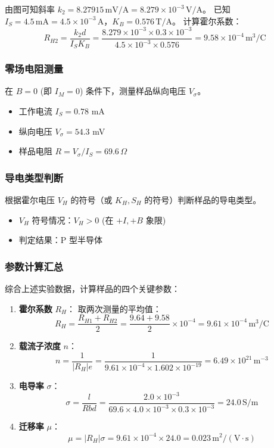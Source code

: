 \documentclass[12pt,a4paper]{article}
\begin{document}
由图可知斜率 $k_2 = 8.27915 \, \text{mV/A} = 8.279 \times 10^{-3} \, \text{V/A}$。
已知 $I_S = 4.5 \, \text{mA} = 4.5 \times 10^{-3} \, \text{A}$，$K_B = 0.576 \, \text{T/A}$。
计算霍尔系数：
\[ R_{H2} = \frac{k_2 d}{I_S K_B} = \frac{8.279 \times 10^{-3} \times 0.3 \times 10^{-3}}{4.5 \times 10^{-3} \times 0.576} = 9.58 \times 10^{-4} \, \text{m}^3/\text{C} \]

\subsubsection{零场电阻测量}
在 $B=0$ (即 $I_M=0$) 条件下，测量样品纵向电压 $V_\sigma$。
\begin{itemize}
    \item 工作电流 $I_S = 0.78$ mA
    \item 纵向电压 $V_\sigma = 54.3$ mV
    \item 样品电阻 $R = V_\sigma / I_S = 69.6 \, \Omega$
\end{itemize}

\subsubsection{导电类型判断}
根据霍尔电压 $V_H$ 的符号（或 $K_H, S_H$ 的符号）判断样品的导电类型。
\begin{itemize}
    \item $V_H$ 符号情况：$V_H > 0$ (在 $+I, +B$ 象限)
    \item 判定结果：P 型半导体
\end{itemize}

\subsubsection{参数计算汇总}
综合上述实验数据，计算样品的四个关键参数：
\begin{enumerate}
    \item \textbf{霍尔系数} $R_H$：
    取两次测量的平均值：
    \[ R_H = \frac{R_{H1} + R_{H2}}{2} = \frac{9.64 + 9.58}{2} \times 10^{-4} = 9.61 \times 10^{-4} \, \text{m}^3/\text{C} \]
    \item \textbf{载流子浓度} $n$：
    \[ n = \frac{1}{|R_H| e} = \frac{1}{9.61 \times 10^{-4} \times 1.602 \times 10^{-19}} = 6.49 \times 10^{21} \, \text{m}^{-3} \]
    \item \textbf{电导率} $\sigma$：
    \[ \sigma = \frac{l}{R b d} = \frac{2.0 \times 10^{-3}}{69.6 \times 4.0 \times 10^{-3} \times 0.3 \times 10^{-3}} = 24.0 \, \text{S/m} \]
    \item \textbf{迁移率} $\mu$：
    \[ \mu = |R_H| \sigma = 9.61 \times 10^{-4} \times 24.0 = 0.023 \, \text{m}^2/(\text{V}\cdot\text{s}) \]
\end{enumerate}
\end{document}
